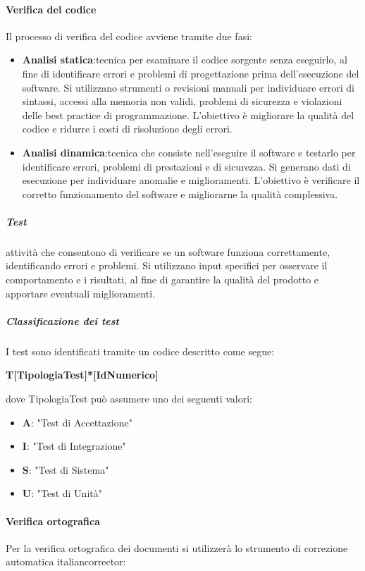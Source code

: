 \documentclass[12pt]{article}
\begin{document}
\paragraph{Verifica del codice}
Il processo di verifica del codice avviene tramite due fasi:
\begin{itemize}
	\item \textbf{Analisi statica}:tecnica per esaminare il codice sorgente senza eseguirlo, al fine di identificare errori e problemi di progettazione prima dell'esecuzione del software. Si utilizzano strumenti o revisioni manuali per individuare errori di sintassi, accessi alla memoria non validi, problemi di sicurezza e violazioni delle best practice di programmazione. L'obiettivo è migliorare la qualità del codice e ridurre i costi di risoluzione degli errori.
	\item \textbf{Analisi dinamica}:tecnica che consiste nell'eseguire il software e testarlo per identificare errori, problemi di prestazioni e di sicurezza. Si generano dati di esecuzione per individuare anomalie e miglioramenti. L'obiettivo è verificare il corretto funzionamento del software e migliorarne la qualità complessiva.
\end{itemize}	

\subparagraph{Test} attività che consentono di verificare se un software funziona correttamente, identificando errori e problemi. Si utilizzano input specifici per osservare il comportamento e i risultati, al fine di garantire la qualità del prodotto e apportare eventuali miglioramenti.

\subparagraph{Classificazione dei test} 
I test sono identificati tramite un codice descritto come segue:
\begin{center}
    \textbf{T[TipologiaTest]*[IdNumerico]}
\end{center}

dove TipologiaTest può assumere uno dei seguenti valori:
\begin{itemize}
    \item \textbf{A}: "Test di Accettazione"
    \item \textbf{I}: "Test di Integrazione"
    \item \textbf{S}: "Test di Sistema"
    \item \textbf{U}: "Test di Unità"
\end{itemize}

\paragraph{Verifica ortografica}
Per la verifica ortografica dei documenti  si utilizzerà lo strumento di correzione
automatica italiancorrector:
\end{document}

